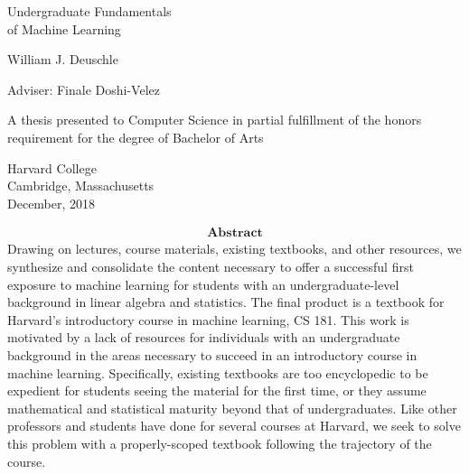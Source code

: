 \documentclass[11pt,twoside,letterpaper,openany]{book}
\begin{document}
\frontmatter

	\begin{titlepage}
	\raggedright\thispagestyle{empty}
	{\Huge Undergraduate Fundamentals \\ of Machine Learning}

	\begin{center}
		{ William J. Deuschle} \\
	\end{center}
	\begin{center}
		{ Adviser: Finale Doshi-Velez}
	\end{center}
	\begin{center}
		A thesis presented to Computer Science in partial fulfillment of the honors requirement for the degree of Bachelor of Arts \\
	\end{center}

	{\Large Harvard College \\ Cambridge, Massachusetts \\ December, 2018\\}
	\end{titlepage}

	\newpage
	\begin{align*}
		\textbf{Abstract}
	\end{align*}
	Drawing on lectures, course materials, existing textbooks, and other resources, we synthesize and consolidate the content necessary to offer a successful first exposure to machine learning for students with an undergraduate-level background in linear algebra and statistics. The final product is a textbook for Harvard's introductory course in machine learning, CS 181. \newline \newline
	This work is motivated by a lack of resources for individuals with an undergraduate background in the areas necessary to succeed in an introductory course in machine learning. Specifically, existing textbooks are too encyclopedic to be expedient for students seeing the material for the first time, or they assume mathematical and statistical maturity beyond that of undergraduates. Like other professors and students have done for several courses at Harvard, we seek to solve this problem with a properly-scoped textbook following the trajectory of the course.
\end{document}
